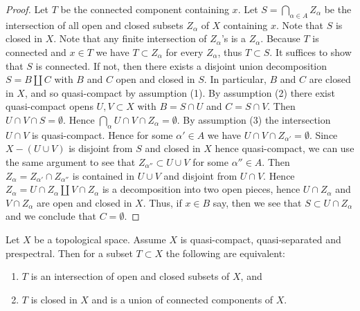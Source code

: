 \begin{proof}
  Let $T$ be the connected component containing $x$. Let $S = \bigcap_{\alpha \in A} Z_\alpha$ be the intersection of all open and closed subsets $Z_\alpha$ of $X$ containing $x$. Note that $S$ is closed in $X$. Note that any finite intersection of $Z_\alpha$'s is a $Z_\alpha$. Because $T$ is connected and $x \in T$ we have $T \subset Z_\alpha$ for every \(Z_\alpha\), thus \(T \subset S\). It suffices to show that $S$ is connected. If not, then there exists a disjoint union decomposition $S = B \amalg C$ with $B$ and $C$ open and closed in $S$. In particular, $B$ and $C$ are closed in $X$, and so quasi-compact by assumption (1). By assumption (2) there exist quasi-compact opens $U, V \subset X$ with $B = S \cap U$ and $C = S \cap V$. Then $U \cap V \cap S = \emptyset$. Hence $\bigcap_\alpha U \cap V \cap Z_\alpha = \emptyset$. By assumption (3) the intersection $U \cap V$ is quasi-compact. Hence for some $\alpha' \in A$ we have $U \cap V \cap Z_{\alpha'} = \emptyset$. Since $X - (U \cup V)$ is disjoint from $S$ and closed in $X$ hence quasi-compact, we can use the same argument to see that $Z_{\alpha''} \subset U \cup V$ for some $\alpha'' \in A$. Then $Z_\alpha = Z_{\alpha'} \cap Z_{\alpha''}$ is contained in $U \cup V$ and disjoint from $U \cap V$. Hence $Z_\alpha = U \cap Z_\alpha \amalg V \cap Z_\alpha$ is a decomposition into two open pieces, hence $U \cap Z_\alpha$ and $V \cap Z_\alpha$ are open and closed in $X$. Thus, if $x \in B$ say, then we see that $S \subset U \cap Z_\alpha$ and we conclude that $C = \emptyset$.
\end{proof}

\begin{lemma}
  \label{thm:intersection-closed-open-iff} %
  Let $X$ be a topological space. Assume $X$ is quasi-compact, quasi-separated
  and prespectral. Then for a subset $T \subset X$ the following are equivalent:
  \begin{enumerate}
    \item $T$ is an intersection of open and closed subsets of $X$, and
    \item $T$ is closed in $X$ and is a union of connected components of $X$.
  \end{enumerate}
\end{lemma}

